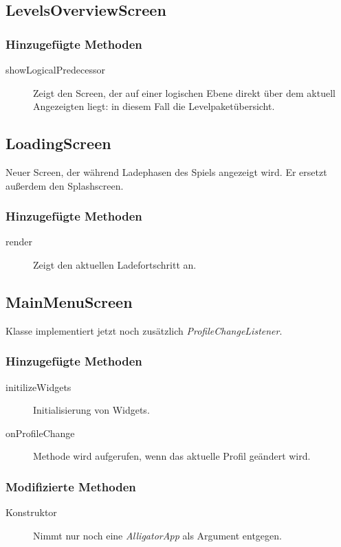\subsection{LevelsOverviewScreen}
\subsubsection{Hinzugefügte Methoden}
\begin{description}
\item[showLogicalPredecessor]
Zeigt den Screen, der auf einer logischen Ebene direkt über dem aktuell Angezeigten liegt: in diesem Fall die Levelpaketübersicht.

\end{description}


\subsection{LoadingScreen}
Neuer Screen, der während Ladephasen des Spiels angezeigt wird. Er ersetzt außerdem den Splashscreen.

\subsubsection{Hinzugefügte Methoden}
\begin{description}
\item[render]
Zeigt den aktuellen Ladefortschritt an.


\end{description}



\subsection{MainMenuScreen}
Klasse implementiert jetzt noch zusätzlich \emph{ProfileChangeListener}.

\subsubsection{Hinzugefügte Methoden}
\begin{description}
\item[initilizeWidgets]
Initialisierung von Widgets.
\item[onProfileChange]
Methode wird aufgerufen, wenn das aktuelle Profil geändert wird.

\end{description}

\subsubsection{Modifizierte Methoden}
\begin{description}
\item[Konstruktor]
Nimmt nur noch eine \emph{AlligatorApp} als Argument entgegen.

\end{description}


